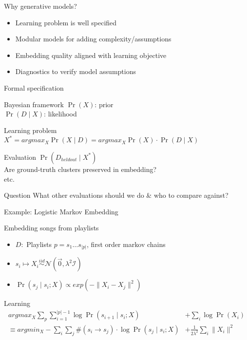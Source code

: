 \documentclass{beamer}
\begin{document}
\begin{frame}{Why generative models?}
  \begin{itemize}
    \item Learning problem is well specified
    \item Modular models for adding complexity/assumptions
    \item Embedding quality aligned with learning objective
    \item Diagnostics to verify model assumptions
  \end{itemize}
\end{frame}

\begin{frame}{Formal specification}
  \begin{block}{Bayesian framework}
    $\Pr(X)$: prior\\
    $\Pr(D \mid X)$: likelihood
  \end{block}
  \begin{block}{Learning problem}
	$X^* = argmax_{ X } \Pr(X \mid D) = argmax_{ X } \Pr(X) \cdot \Pr(D \mid X)$
  \end{block}
  \begin{block}{Evaluation}
	$\Pr(D_{heldout} \mid X^*)$\\
    Are ground-truth clusters preserved in embedding?\\
    etc.
  \end{block}
  \pause
  \begin{alertblock}{Question}
	What other evaluations should we do \& who to compare against?
  \end{alertblock}
\end{frame}

\begin{frame}{Example: Logistic Markov Embedding}
  \begin{block}{Embedding songs from playlists \cite{LME}}
  	\begin{itemize}
    		\item $D: $ Playlists $p = s_1 \dots s_{|p|}$, first order markov chains
    		\item $s_i \mapsto X_i \overset{iid}{\sim} \mathcal{N}(\vec{0}, \lambda^2 \mathcal{I})$\\
    		\item $\Pr(s_j \mid s_i ; X) \propto exp(-\| X_i - X_j \|^2)$
    \end{itemize}
    \end{block}
    \begin{block}{Learning}
    		\begin{align*}
    		argmax_{ X } \sum_p \sum_{i=1}^{|p|-1} \log \Pr(s_{i+1} \mid s_i ; X) &+ \sum_i \log \Pr(X_i) \\
		\equiv argmin_{ X } -\sum_i \sum_j \#(s_i \rightarrow s_j) \cdot \log \Pr(s_j \mid s_i ; X) &+ \frac{1}{2 \lambda^2} \sum_i \| X_i \|^2
		\end{align*}
    \end{block}
\end{frame}
\end{document}
